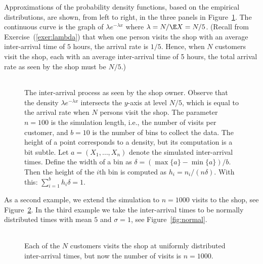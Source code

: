 Approximations of the probability density functions, based on the empirical distributions, are shown, from left to right,
in the three panels in Figure~\ref{fig:uniformfew}. The continuous
curve is the graph of $\lambda e^{-\lambda x}$ where
$\lambda = N/\E X = N/5$. (Recall from Exercise~(\ref{exer:lambda}) that when one
person visits the shop  with an average inter-arrival time of $5$
hours,  the arrival rate is $1/5$. Hence, when $N$ customers visit the shop, each with an average inter-arrival time of 5 hours, the total arrival rate as seen by the shop must be $N/5$.)


\begin{figure}[ht]
  \centering
  \begin{tabular}[h]{c}
 \\
  \end{tabular}
  \caption{The inter-arrival process as seen by the shop owner. Observe
    that the density $\lambda e^{-\lambda x}$ intersects the $y$-axis
    at level $N/5$, which is equal to the arrival rate when $N$
    persons visit the shop. The parameter $n=100$ is the simulation
    length, i.e., the number of visits per customer, and $b=10$ is the
    number of bins to collect the data. The height of a point corresponds to a density, but its computation is a bit subtle. Let $a=(X_1, \ldots, X_n)$ denote the simulated inter-arrival times. Define the width of a bin as $\delta = (\max\{a\} - \min\{a\})/b$. Then the height of the $i$th bin is computed as $h_i = n_i/(n \delta)$. With this: $\sum_{i=1}^b h_i \delta = 1$.}
  \label{fig:uniformfew}
\end{figure}

As a second
example, we extend the simulation to $n=1000$ visits to the shop, see
Figure~\ref{fig:uniformmany}. In the third example we take the
inter-arrival times to be normally distributed times with mean $5$ and
$\sigma=1$, see Figure~\ref{fig:normal}.

\begin{figure}[ht]
  \centering
  \begin{tabular}[h]{c}
 \\
  \end{tabular}
  \caption{Each of the $N$ customers visits the shop at uniformly 
    distributed inter-arrival times, but now the number of visits is
    $n=1000$.}  
  \label{fig:uniformmany}
\end{figure}

